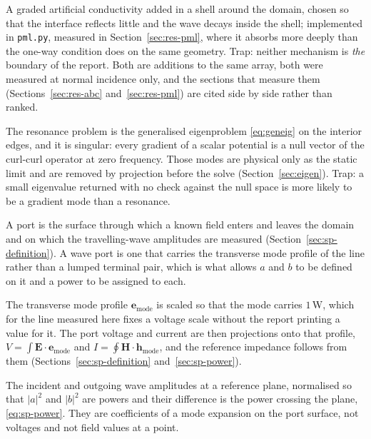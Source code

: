 \begin{description}[leftmargin=1.6em,style=nextline,itemsep=4pt]
  \item[PML; matched lossy layer.]
        A graded artificial conductivity added in a shell around the domain, chosen so that the interface
        reflects little and the wave decays inside the shell; implemented in \texttt{pml.py}, measured in
        Section~\ref{sec:res-pml}, where it absorbs more deeply than the one-way condition does on the same
        geometry. Trap: neither mechanism is \emph{the} boundary of the report. Both are additions to the same
        array, both were measured at normal incidence only, and the sections that measure them
        (Sections~\ref{sec:res-abc} and~\ref{sec:res-pml}) are cited side by side rather than ranked.

  \item[Cavity eigenproblem and the gradient null space.]
        The resonance problem is the generalised eigenproblem \eqref{eq:geneig} on the interior edges, and it is
        singular: every gradient of a scalar potential is a null vector of the curl-curl operator at zero
        frequency. Those modes are physical only as the static limit and are removed by projection before the
        solve (Section~\ref{sec:eigen}). Trap: a small eigenvalue returned with no check against the null space is
        more likely to be a gradient mode than a resonance.

  \item[Port; wave port.]
        A port is the surface through which a known field enters and leaves the domain and on which the
        travelling-wave amplitudes are measured (Section~\ref{sec:sp-definition}). A wave port is one that
        carries the transverse mode profile of the line rather than a lumped terminal pair, which is what allows
        $a$ and $b$ to be defined on it and a power to be assigned to each.

  \item[Mode normalisation.]
        The transverse mode profile $\mathbf{e}_{\text{mode}}$ is scaled so that the mode carries $1$\,W, which
        for the line measured here fixes a voltage scale without the report printing a value for it. The port
        voltage and current are then projections onto that profile, $V=\int\mathbf{E}\cdot
        \mathbf{e}_{\text{mode}}$ and $I=\oint\mathbf{H}\cdot\mathbf{h}_{\text{mode}}$, and the reference
        impedance follows from them (Sections~\ref{sec:sp-definition} and~\ref{sec:sp-power}).

  \item[Travelling waves $a$ and $b$.]
        The incident and outgoing wave amplitudes at a reference plane, normalised so that $|a|^2$ and $|b|^2$
        are powers and their difference is the power crossing the plane, \eqref{eq:sp-power}. They are
        coefficients of a mode expansion on the port surface, not voltages and not field values at a point.


\end{description}
